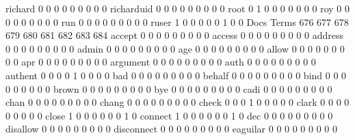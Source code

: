 \documentclass[compress,8pt]{beamer}
\begin{document}
\begin{frame}
\begin{Schunk}
  richard                                    0   0   0   0   0   0   0   0   0
  richarduid                                 0   0   0   0   0   0   0   0   0
  root                                       0   1   0   0   0   0   0   0   0
  roy                                        0   0   0   0   0   0   0   0   0
  run                                        0   0   0   0   0   0   0   0   0
  ruser                                      1   0   0   0   0   0   1   0   0
                                          Docs
Terms                                      676 677 678 679 680 681 682 683 684
  accept                                     0   0   0   0   0   0   0   0   0
  access                                     0   0   0   0   0   0   0   0   0
  address                                    0   0   0   0   0   0   0   0   0
  admin                                      0   0   0   0   0   0   0   0   0
  age                                        0   0   0   0   0   0   0   0   0
  allow                                      0   0   0   0   0   0   0   0   0
  apr                                        0   0   0   0   0   0   0   0   0
  argument                                   0   0   0   0   0   0   0   0   0
  auth                                       0   0   0   0   0   0   0   0   0
  authent                                    0   0   0   0   1   0   0   0   0
  bad                                        0   0   0   0   0   0   0   0   0
  behalf                                     0   0   0   0   0   0   0   0   0
  bind                                       0   0   0   0   0   0   0   0   0
  brown                                      0   0   0   0   0   0   0   0   0
  bye                                        0   0   0   0   0   0   0   0   0
  cadi                                       0   0   0   0   0   0   0   0   0
  chan                                       0   0   0   0   0   0   0   0   0
  chang                                      0   0   0   0   0   0   0   0   0
  check                                      0   0   0   1   0   0   0   0   0
  clark                                      0   0   0   0   0   0   0   0   0
  close                                      1   0   0   0   0   0   0   1   0
  connect                                    1   0   0   0   0   0   0   1   0
  dec                                        0   0   0   0   0   0   0   0   0
  disallow                                   0   0   0   0   0   0   0   0   0
  disconnect                                 0   0   0   0   0   0   0   0   0
  eaguilar                                   0   0   0   0   0   0   0   0   0

\end{Schunk}
\end{frame}
\end{document}
